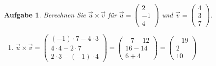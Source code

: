 \documentclass[12pt]{article}
\newtheorem{exercise}[satz]{Aufgabe}
\begin{document}
\vspace{0.1cm}
   
\begin{exercise}
  Berechnen Sie $\vec{u}\times \vec{v}$ f\"ur
  $\vec{u}=\left(\begin{array}{r} 2 \\ -1 \\ 4 \end{array}\right)$ und
  $\vec{v}=\left(\begin{array}{r} 4 \\ 3 \\ 7 \end{array}\right)$.\\
  \begin{enumerate}
    \item[]
      $\vec{u}\times \vec{v}
      =\left(\begin{array}{r} (-1)\cdot7 - 4\cdot3 \\ 4\cdot4 - 2\cdot7 \\ 2\cdot3 - (-1)\cdot 4 \end{array}\right)
      =\left(\begin{array}{r} -7-12 \\ 16-14 \\ 6+4 \end{array}\right)
      =\left(\begin{array}{r} -19 \\ 2 \\ 10 \end{array}\right) $\\
  \end{enumerate}
\end{exercise}

\vspace{0.1cm}
\end{document}
